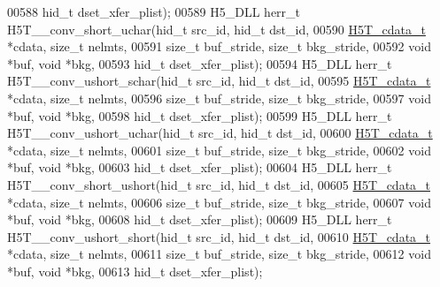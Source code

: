 \begin{DoxyCode}
00588                                     hid\_t dset\_xfer\_plist);
00589 H5\_DLL herr\_t H5T\_\_conv\_short\_uchar(hid\_t src\_id, hid\_t dst\_id,
00590                     \hyperlink{struct_h5_t__cdata__t}{H5T\_cdata\_t} *cdata, \textcolor{keywordtype}{size\_t} nelmts,
00591                     \textcolor{keywordtype}{size\_t} buf\_stride, \textcolor{keywordtype}{size\_t} bkg\_stride,
00592                                     \textcolor{keywordtype}{void} *buf, \textcolor{keywordtype}{void} *bkg,
00593                                     hid\_t dset\_xfer\_plist);
00594 H5\_DLL herr\_t H5T\_\_conv\_ushort\_schar(hid\_t src\_id, hid\_t dst\_id,
00595                      \hyperlink{struct_h5_t__cdata__t}{H5T\_cdata\_t} *cdata, \textcolor{keywordtype}{size\_t} nelmts,
00596                      \textcolor{keywordtype}{size\_t} buf\_stride, \textcolor{keywordtype}{size\_t} bkg\_stride,
00597                                      \textcolor{keywordtype}{void} *buf, \textcolor{keywordtype}{void} *bkg,
00598                                      hid\_t dset\_xfer\_plist);
00599 H5\_DLL herr\_t H5T\_\_conv\_ushort\_uchar(hid\_t src\_id, hid\_t dst\_id,
00600                      \hyperlink{struct_h5_t__cdata__t}{H5T\_cdata\_t} *cdata, \textcolor{keywordtype}{size\_t} nelmts,
00601                      \textcolor{keywordtype}{size\_t} buf\_stride, \textcolor{keywordtype}{size\_t} bkg\_stride,
00602                                      \textcolor{keywordtype}{void} *buf, \textcolor{keywordtype}{void} *bkg,
00603                                      hid\_t dset\_xfer\_plist);
00604 H5\_DLL herr\_t H5T\_\_conv\_short\_ushort(hid\_t src\_id, hid\_t dst\_id,
00605                      \hyperlink{struct_h5_t__cdata__t}{H5T\_cdata\_t} *cdata, \textcolor{keywordtype}{size\_t} nelmts,
00606                      \textcolor{keywordtype}{size\_t} buf\_stride, \textcolor{keywordtype}{size\_t} bkg\_stride,
00607                                      \textcolor{keywordtype}{void} *buf, \textcolor{keywordtype}{void} *bkg,
00608                                      hid\_t dset\_xfer\_plist);
00609 H5\_DLL herr\_t H5T\_\_conv\_ushort\_short(hid\_t src\_id, hid\_t dst\_id,
00610                      \hyperlink{struct_h5_t__cdata__t}{H5T\_cdata\_t} *cdata, \textcolor{keywordtype}{size\_t} nelmts,
00611                      \textcolor{keywordtype}{size\_t} buf\_stride, \textcolor{keywordtype}{size\_t} bkg\_stride,
00612                                      \textcolor{keywordtype}{void} *buf, \textcolor{keywordtype}{void} *bkg,
00613                                      hid\_t dset\_xfer\_plist);

\end{DoxyCode}
